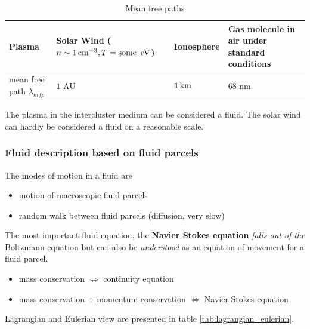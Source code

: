 \begin{table}[!htb]
    \centering
    \begin{tabular}{|p{}|p{}|p{}|p{}|}
        \hline
        \textcolor{blue1}{Plasma} & Solar Wind ($n \sim 1 \operatorname{cm}^{-3}, T = \text{some } \operatorname{eV}$) & Ionosphere & Gas molecule in air under standard conditions \\
        \hline
        \textcolor{blue1}{mean free path $\lambda_{mfp}$} & $1$ AU & $1 \operatorname{km}$ & $68$ nm \\
        \hline
    \end{tabular}
    \caption{Mean free paths}
    \label{tab:mean_free_path}
\end{table}
The plasma in the intercluster medium can be considered a fluid. The solar wind can hardly be considered a fluid
on a reasonable scale.

\subsubsection{Fluid description based on fluid parcels}
The modes of motion in a fluid are
\begin{itemize}
    \item motion of macroscopic fluid parcels
    \item random walk between fluid parcels (diffusion, very slow)
\end{itemize}
The most important fluid equation, the \textbf{Navier Stokes equation} \textit{falls out of the} Boltzmann equation
but can also be \textit{understood} as an equation of movement for a fluid parcel.
\begin{itemize}
    \item mass conservation $\Longleftrightarrow$ continuity equation
    \item mass conservation + momentum conservation $\Longleftrightarrow$ Navier Stokes equation
\end{itemize}

Lagrangian and Eulerian view are presented in table \ref{tab:lagrangian_eulerian}.

